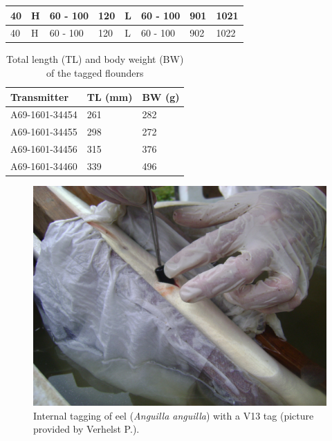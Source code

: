 \begin{table}[]
\begin{tabular}{|l|l|l|l|l|l|l|l|}
40                                                                                    & H  & 60 - 100                                                         & 120                                                        & L  & 60 - 100                                                         & 901                                                        & 1021                                                                               \\ \hline
40                                                                                    & H  & 60 - 100                                                         & 120                                                        & L  & 60 - 100                                                         & 902                                                        & 1022                                                                               \\ \hline
\end{tabular}
\end{table}

\begin{table}[]
\centering
\scriptsize
\caption{Total length (TL) and body weight (BW) of the tagged flounders}
\label{dimensionsTaggedFlounder}
\begin{tabular}{|l|l|l|}
\hline
Transmitter    & TL (mm) & BW (g) \\ \hline
A69-1601-34454 & 261     & 282    \\ \hline
A69-1601-34455 & 298     & 272    \\ \hline
A69-1601-34456 & 315     & 376    \\ \hline
A69-1601-34460 & 339     & 496    \\ \hline
\end{tabular}
\end{table}

\begin{figure}[h!]
  \centering\includegraphics[scale=0.37]{Eeltagged}
  \caption{Internal tagging of eel (\textit{Anguilla anguilla}) with a V13 tag (picture provided by Verhelst P.).}
  \label{fig:Eeltagged}
\end{figure}

